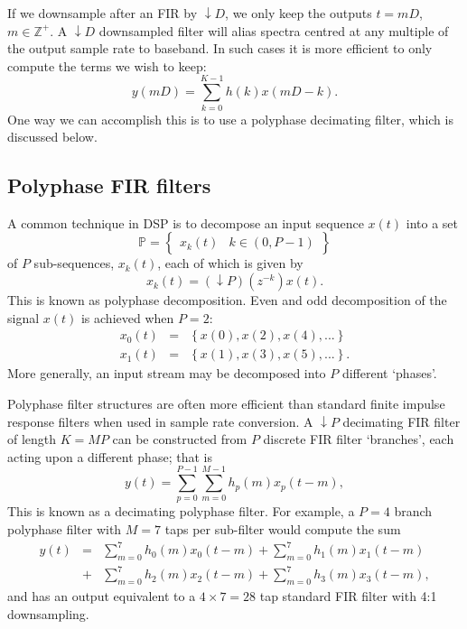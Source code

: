 \documentclass{ws-rv961x669}
\begin{document}
If we downsample after an FIR by $\downarrow D$, we only keep the outputs $t=mD$, $m\in\mathbb{Z}^{+}$. A $\downarrow D$ downsampled filter will alias spectra centred at any multiple of the output sample rate to baseband. In such cases it is more efficient to only compute the terms we wish to keep: 
\begin{equation}
y(mD)=\sum_{k=0}^{K-1}h(k)x(mD-k).\label{eq:FIR-filter-decimated}
\end{equation}
One way we can accomplish this is to use a polyphase decimating filter, which is discussed below. 


\subsection{Polyphase FIR filters}

A common technique in DSP is to decompose an input sequence $x(t)$ into a set
\begin{equation}
\mathbb{P}=\begin{Bmatrix}x_{k}(t) & k\in(0,P-1)\end{Bmatrix}
\end{equation}
of $P$ sub-sequences, $x_{k}(t)$, each of which is given by 
\begin{equation}
x_{k}(t)=(\downarrow P)(z^{-k})x(t).
\end{equation}
This is known as polyphase decomposition. Even and odd decomposition
of the signal $x(t)$ is achieved when $P=\mbox{2}$:
\begin{eqnarray}
x_{0}(t) & = & \left\{ x(0),x(2),x(4),...\right\} \\
x_{1}(t) & = & \left\{ x(1),x(3),x(5),...\right\} .
\end{eqnarray}
More generally, an input stream may be decomposed into $P$ different `phases'.

Polyphase filter structures are often more efficient than standard finite impulse response filters when used in sample rate conversion. A $\downarrow P$ decimating FIR filter of length $K=MP$ can be constructed from $P$ discrete FIR filter `branches', each acting upon a different phase; that is
\begin{equation}
y(t)=\sum_{p=0}^{P-1}\sum_{m=0}^{M-1}h_{p}(m)x_{p}(t-m),\label{eq:FIR-polyphase-filter}
\end{equation}
This is known as a decimating polyphase filter. For example, a $P=\mbox{4}$ branch polyphase filter with $M=\mbox{7}$ taps per sub-filter would compute the sum
\begin{eqnarray}
y(t) & = & \sum_{m=0}^{7}h_{0}(m)x_{0}(t-m)+\sum_{m=0}^{7}h_{1}(m)x_{1}(t-m)\nonumber \\
 & + & \sum_{m=0}^{7}h_{2}(m)x_{2}(t-m)+\sum_{m=0}^{7}h_{3}(m)x_{3}(t-m),
\end{eqnarray}
and has an output equivalent to a $\mbox{4}\times\mbox{7}=\mbox{28}$ tap standard FIR filter with 4:1 downsampling. 
\end{document}
